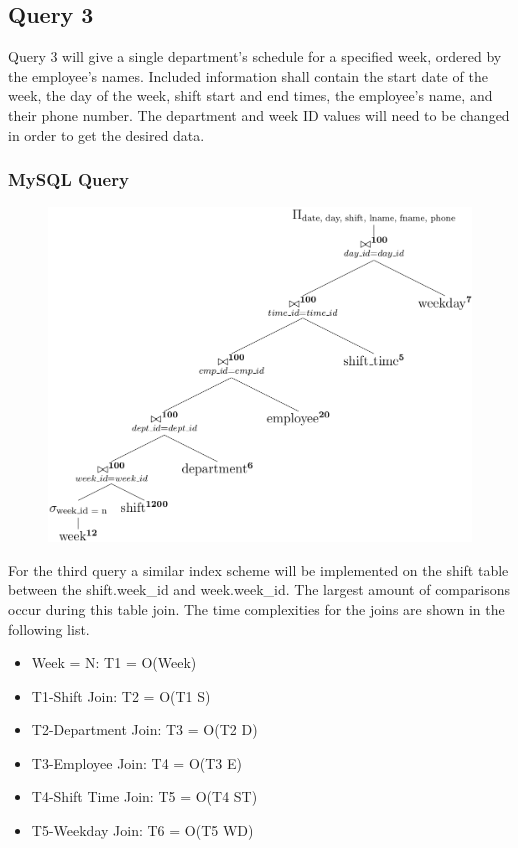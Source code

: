 \documentclass[letter,12pt]{texMemo}
\begin{document}
\subsection*{Query 3}
Query 3 will give a single department's schedule for a specified week, ordered by the employee's names. Included information shall contain the start date of the week, the day of the week, shift start and end times, the employee's name, and their phone number. The department and week ID values will need to be changed in order to get the desired data.\subsubsection*{MySQL Query}
	
\begin{figure}[H]
	\centering
	\includegraphics[width=.6\textwidth]{query3.png}
\end{figure}
For the third query a similar index scheme will be implemented on the shift table between the shift.week\_id and week.week\_id. The largest amount of comparisons occur during this table join. The time complexities for the joins are shown in the following list.
\begin{itemize}[noitemsep,nolistsep]
	\item Week = N: T1 = O(Week)
	\item T1-Shift Join: T2 = O(T1 S)
	\item T2-Department Join: T3 = O(T2 D)
	\item T3-Employee Join: T4 = O(T3 E)
	\item T4-Shift Time Join: T5 = O(T4 ST)
	\item T5-Weekday Join: T6 = O(T5 WD)
\end{itemize}
\end{document}
